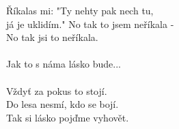 \color{blue}
Říkalas mi: "Ty nehty pak nech tu,\\
já je uklidím."
\color{red}
No tak to jsem neříkala -\\
\color{blue}
No tak jsi to neříkala.\\
\\
\color{red}
Jak to s náma lásko bude...\\
\\
Vždyť \textcolor{black}{}za pokus to \textcolor{black}{}stojí.\\
\color{blue}
Do lesa \textcolor{black}{}nesmí, kdo se \textcolor{black}{}bojí.\\
\color{black}
Tak si \textcolor{black}{}lásko pojďme \textcolor{black}{}vyho\textcolor{black}{}vět.
